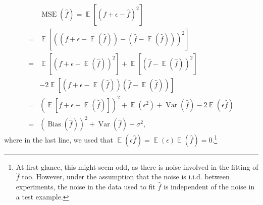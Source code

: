 \documentclass[twocolumn,english,notitlepage]{article}
\newcommand{\pclosed}[1]{\left(#1\right)}
\newcommand{\bclosed}[1]{\left[#1\right]}
\renewcommand{\expval}{\operatorname{\mathbb{E}}}
\renewcommand{\var}{\operatorname{Var}}
\newcommand{\bias}{\operatorname{Bias}}
\begin{document}
\begin{appendix}
    \begin{align} \nonumber
        &\operatorname{MSE}(\hat{f}) = \expval\bclosed{(f+\epsilon-\hat{f})^2} \\ \nonumber
        =& \expval\bclosed{\pclosed{(f+\epsilon-\expval(\hat{f}))- (\hat{f}-\expval(\hat{f}))}^2} \\ \nonumber
        =& \expval\bclosed{\pclosed{f+\epsilon-\expval(\hat{f})}^2} + \expval\bclosed{\pclosed{\hat{f}-\expval(\hat{f})}^2} \\ \nonumber
        &-2 \expval\bclosed{ (f+\epsilon-\expval(\hat{f})) (\hat{f}-\expval(\hat{f})) } \\ \nonumber
        =& \pclosed{\expval\bclosed{f+\epsilon-\expval(\hat{f})}}^2 + \expval(\epsilon^2) + \var(\hat{f}) - 2\expval(\epsilon \hat{f}) \\
        =& \pclosed{\bias(\hat{f})}^2 + \var(\hat{f}) + \sigma^2,
    \end{align}
    where in the last line, we used that $\expval(\epsilon\hat{f}) = \expval(\epsilon)\expval(\hat{f})=0$.\footnote{At first glance, this might seem odd, as there is noise involved in the fitting of $\hat{f}$ too. However, under the assumption that the noise is i.i.d. between experiments, the noise in the data used to fit $\hat{f}$ is independent of the noise in a test example.}


\end{appendix}
\end{document}
